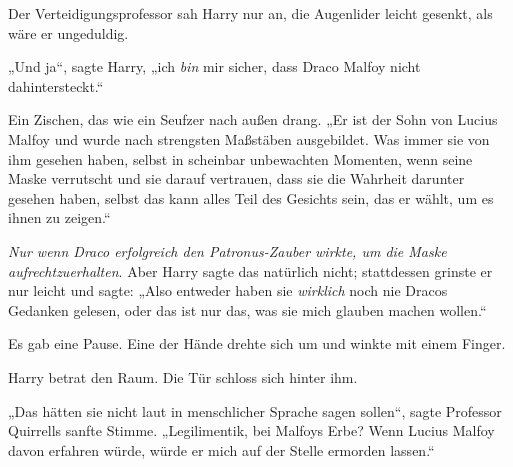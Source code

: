 Der Verteidigungsprofessor sah Harry nur an, die Augenlider leicht gesenkt, als wäre er ungeduldig.

„Und ja“, sagte Harry, „ich \emph{bin} mir sicher, dass Draco Malfoy nicht dahintersteckt.“

Ein Zischen, das wie ein Seufzer nach außen drang.
„Er ist der Sohn von Lucius Malfoy und wurde nach strengsten Maßstäben ausgebildet. Was immer sie von ihm gesehen haben, selbst in scheinbar unbewachten Momenten, wenn seine Maske verrutscht und sie darauf vertrauen, dass sie die Wahrheit darunter gesehen haben, selbst das kann alles Teil des Gesichts sein, das er wählt, um es ihnen zu zeigen.“

\emph{Nur wenn Draco erfolgreich den Patronus-Zauber wirkte, um die Maske aufrechtzuerhalten}. Aber Harry sagte das natürlich nicht; stattdessen grinste er nur leicht und sagte:
„Also entweder haben sie \emph{wirklich} noch nie Dracos Gedanken gelesen, oder das ist nur das, was sie mich glauben machen wollen.“

Es gab eine Pause. Eine der Hände drehte sich um und winkte mit einem Finger.

Harry betrat den Raum. Die Tür schloss sich hinter ihm.

„Das hätten sie nicht laut in menschlicher Sprache sagen sollen“, sagte Professor Quirrells sanfte Stimme.
„Legilimentik, bei Malfoys Erbe? Wenn Lucius Malfoy davon erfahren würde, würde er mich auf der Stelle ermorden lassen.“

